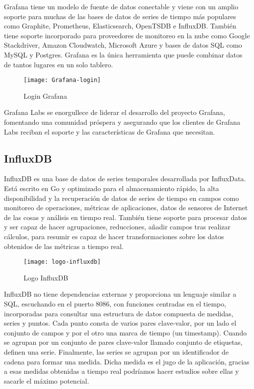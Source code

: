 \documentclass[ spanish, a4paper, 12pt, oneside]{report}
\begin{document}
Grafana tiene un modelo de fuente de datos conectable y viene con un amplio soporte para muchas de las bases de datos de series de tiempo más populares como Graphite, Prometheus, Elasticsearch, OpenTSDB e InfluxDB. También tiene soporte incorporado 
para proveedores de monitoreo en la nube como Google Stackdriver, Amazon Cloudwatch, Microsoft Azure y bases de datos SQL como MySQL y Postgres. Grafana es la única herramienta que puede combinar datos de tantos lugares en un solo tablero. \\

\begin{figure}[!h]
   \centering
   \texttt{[image: Grafana-login]}\\
      \caption{\label{fig: Login Grafana} Login Grafana}
\end{figure}

Grafana Labs se enorgullece de liderar el desarrollo del proyecto Grafana, fomentando una comunidad próspera y asegurando que los clientes de Grafana Labs reciban el soporte y las características de Grafana que necesitan. \\

\subsection{InfluxDB}
InfluxDB es una base de datos de series temporales desarrollada por InfluxData. Está escrito en Go y optimizado para el almacenamiento rápido, la alta disponibilidad y la recuperación de datos de series de tiempo en campos como 
monitoreo de operaciones, métricas de aplicaciones, datos de sensores de Internet de las cosas y análisis en tiempo real. También tiene soporte para procesar datos y ser capaz de hacer agrupaciones, reducciones, añadir campos tras realizar cálculos, para resumir es capaz de 
hacer transformaciones sobre los datos obtenidos de las métricas a tiempo real. \\

\begin{figure}[!h]
   \centering
   \texttt{[image: logo-influxdb]}\\
      \caption{\label{fig: Logo InfluxDB} Logo InfluxDB}
\end{figure}

InfluxDB no tiene dependencias externas y proporciona un lenguaje similar a SQL, escuchando en el puerto 8086, con funciones centradas en el tiempo, incorporadas para consultar una estructura de datos compuesta de medidas, series y puntos. Cada punto consta de varios 
pares clave-valor, por un lado el conjunto de campos y por el otro una marca de tiempo (un timestamp). Cuando se agrupan por un conjunto de pares clave-valor llamado conjunto de etiquetas, definen una serie. Finalmente, las series se agrupan por un identificador de cadena para 
formar una medida. Dicha medida es el jugo de la aplicación, gracias a esas medidas obtenidas a tiempo real podríamos hacer estudios sobre ellas y sacarle el máximo potencial. \\
\end{document}
